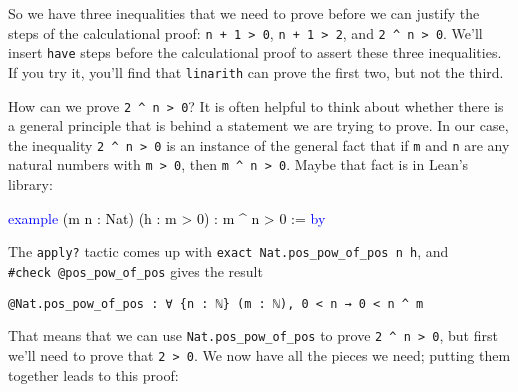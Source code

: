\documentclass[
  letterpaper,
  DIV=11,
  numbers=noendperiod]{scrreprt}
\makeatletter
\newenvironment{Shaded}{\begin{snugshade}}{\end{snugshade}}
\newcommand{\DocumentationTok}[1]{\textcolor[rgb]{0.37,0.37,0.37}{\textit{#1}}}
\newcommand{\KeywordTok}[1]{\textcolor[rgb]{0.00,0.23,0.31}{#1}}
\newcommand{\NormalTok}[1]{\textcolor[rgb]{0.00,0.23,0.31}{#1}}
\newcommand{\SpecialCharTok}[1]{\textcolor[rgb]{0.37,0.37,0.37}{#1}}
\def\bluesquiggly{\bgroup \markoverwith{\textcolor[HTML]{1E90FF}{\lower3.5\p@\hbox{\sixly \char58}}}\ULon}
\renewcommand{\NormalTok}[1]{\textcolor[HTML]{000000}{#1}}
\renewcommand{\KeywordTok}[1]{\textcolor[HTML]{0000FF}{#1}}
\renewcommand{\SpecialCharTok}[1]{}
\renewcommand{\DocumentationTok}[1]{\bluesquiggly{\textcolor[HTML]{0000FF}{#1}}}
\newenvironment{ind}
	{\begin{list}{}{\setlength{\leftmargin}{1em}}\item\relax}
	{\end{list}}
\theoremstyle{remark}
\makeatother
\begin{document}
So we have three inequalities that we need to prove before we can
justify the steps of the calculational proof:
\texttt{n\ +\ 1\ \textgreater{}\ 0},
\texttt{n\ +\ 1\ \textgreater{}\ 2}, and
\texttt{2\ \^{}\ n\ \textgreater{}\ 0}. We'll insert \texttt{have} steps
before the calculational proof to assert these three inequalities. If
you try it, you'll find that \texttt{linarith} can prove the first two,
but not the third.

How can we prove \texttt{2\ \^{}\ n\ \textgreater{}\ 0}? It is often
helpful to think about whether there is a general principle that is
behind a statement we are trying to prove. In our case, the inequality
\texttt{2\ \^{}\ n\ \textgreater{}\ 0} is an instance of the general
fact that if \texttt{m} and \texttt{n} are any natural numbers with
\texttt{m\ \textgreater{}\ 0}, then
\texttt{m\ \^{}\ n\ \textgreater{}\ 0}. Maybe that fact is in Lean's
library:

\begin{Shaded}
\begin{Highlighting}[]
\KeywordTok{example}\NormalTok{ (m n : Nat) (h : m \textgreater{} 0) : m \^{} n \textgreater{} 0 := }\KeywordTok{by} \SpecialCharTok{++}\DocumentationTok{apply?}\SpecialCharTok{::}
\end{Highlighting}
\end{Shaded}

The \texttt{apply?} tactic comes up with
\texttt{exact\ Nat.pos\_pow\_of\_pos\ n\ h}, and
\texttt{\#check\ @pos\_pow\_of\_pos} gives the result

\begin{ind}

\begin{verbatim}
@Nat.pos_pow_of_pos : ∀ {n : ℕ} (m : ℕ), 0 < n → 0 < n ^ m
\end{verbatim}

\end{ind}

That means that we can use \texttt{Nat.pos\_pow\_of\_pos} to prove
\texttt{2\ \^{}\ n\ \textgreater{}\ 0}, but first we'll need to prove
that \texttt{2\ \textgreater{}\ 0}. We now have all the pieces we need;
putting them together leads to this proof:
\end{document}
